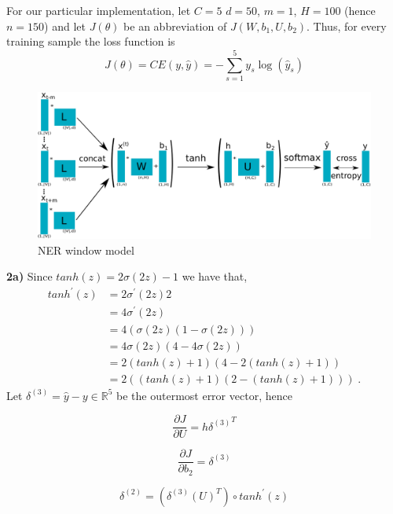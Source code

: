 \documentclass{article}
\begin{document}
For our particular implementation, let $C=5$ $d=50$, $m=1$, $H=100$ (hence $n=150$) and let $J(\theta)$ be an abbreviation of $J(W,b_{1},U,b_{2})$. Thus, for every training sample the loss function is
\begin{equation}\label{eq:5}
J(\theta) = CE(y,\hat{y}) = -\sum_{s=1}^{5} y_s  \log(\hat{y}_s)
\end{equation}


\begin{figure}
\begin{center}
\includegraphics[scale=0.85]{ner.pdf}
\end{center}
\caption{NER window model}
\label{ner}
\end{figure}
\textbf{2a)} Since $tanh(z) = 2\sigma(2z) -1 $ we have that, 
\begin{align*}
tanh^{\prime}(z) & = 2\sigma^{\prime}(2z)2 \\
& =4\sigma^{\prime}(2z) \\
& = 4(\sigma(2z)(1 - \sigma(2z))) \\
& = 4\sigma(2z)(4 - 4\sigma(2z))\\
& =  2(tanh(z)+1)(4 - 2(tanh(z)+1))\\
& = 2((tanh(z)+1)(2 - (tanh(z)+1)))\; .
\end{align*}
Let $\delta^{(3)} = \hat{y} - y \in \mathbb{R}^{5}$ be the outermost error vector, hence

\begin{equation}\label{eq:6}
\frac{\partial J}{\partial  U} = {h \delta^{(3)}}^{T}
\end{equation}

\begin{equation}\label{eq:7}
\frac{\partial J}{\partial  b_{2}} =  \delta^{(3)}
\end{equation}

\begin{equation}\label{eq:8}
\delta^{(2)} = (\delta^{(3)} {(U)}^{T}) \circ {tanh^{\prime}} (z)
\end{equation}
\end{document}
